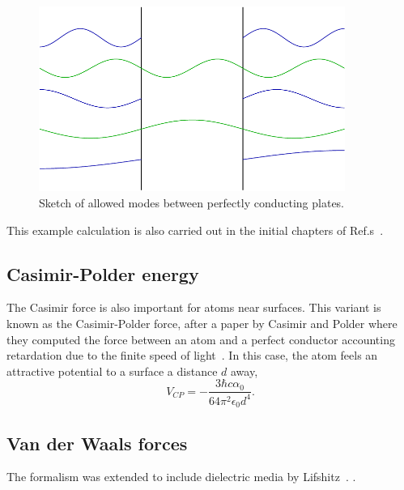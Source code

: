 \begin{figure}
\center
\includegraphics[width=10cm]{fig/intro/twoplanes_wave}
\caption{Sketch of allowed modes between perfectly conducting plates.}
\end{figure}

This example calculation is also carried out in the initial chapters of Ref.s~\cite{Milton2001,Bordag2009,Dalvit2011}.

\subsection{Casimir-Polder energy}

The Casimir force is also important for atoms near surfaces.  
This variant is known as the Casimir-Polder force, 
after a paper by Casimir and Polder where they computed the force between an 
atom and a perfect conductor accounting retardation due to the finite speed 
of light~\cite{CasimirPolder1948}.  
In this case, the atom feels an attractive potential to a surface a distance $d$ away,
\begin{equation}
V_{CP} =-\frac{3\hbar c\alpha_0}{64\pi^2\epsilon_0 d^4}.
\end{equation}


\subsection{Van der Waals forces}

The formalism was extended to include dielectric media by Lifshitz~\cite{Lifshitz1956}.
  .  



